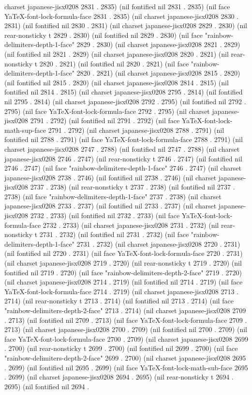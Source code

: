 charset japanese-jisx0208 2831 . 2835) (nil fontified nil 2831 . 2835) (nil face YaTeX-font-lock-formula-face 2831 . 2835) (nil charset japanese-jisx0208 2830 . 2831) (nil fontified nil 2830 . 2831) (nil charset japanese-jisx0208 2829 . 2830) (nil rear-nonsticky t 2829 . 2830) (nil fontified nil 2829 . 2830) (nil face "rainbow-delimiters-depth-1-face" 2829 . 2830) (nil charset japanese-jisx0208 2821 . 2829) (nil fontified nil 2821 . 2829) (nil charset japanese-jisx0208 2820 . 2821) (nil rear-nonsticky t 2820 . 2821) (nil fontified nil 2820 . 2821) (nil face "rainbow-delimiters-depth-1-face" 2820 . 2821) (nil charset japanese-jisx0208 2815 . 2820) (nil fontified nil 2815 . 2820) (nil charset japanese-jisx0208 2814 . 2815) (nil fontified nil 2814 . 2815) (nil charset japanese-jisx0208 2795 . 2814) (nil fontified nil 2795 . 2814) (nil charset japanese-jisx0208 2792 . 2795) (nil fontified nil 2792 . 2795) (nil face YaTeX-font-lock-formula-face 2792 . 2795) (nil charset japanese-jisx0208 2791 . 2792) (nil fontified nil 2791 . 2792) (nil face YaTeX-font-lock-math-sup-face 2791 . 2792) (nil charset japanese-jisx0208 2788 . 2791) (nil fontified nil 2788 . 2791) (nil face YaTeX-font-lock-formula-face 2788 . 2791) (nil charset japanese-jisx0208 2747 . 2788) (nil fontified nil 2747 . 2788) (nil charset japanese-jisx0208 2746 . 2747) (nil rear-nonsticky t 2746 . 2747) (nil fontified nil 2746 . 2747) (nil face "rainbow-delimiters-depth-1-face" 2746 . 2747) (nil charset japanese-jisx0208 2738 . 2746) (nil fontified nil 2738 . 2746) (nil charset japanese-jisx0208 2737 . 2738) (nil rear-nonsticky t 2737 . 2738) (nil fontified nil 2737 . 2738) (nil face "rainbow-delimiters-depth-1-face" 2737 . 2738) (nil charset japanese-jisx0208 2733 . 2737) (nil fontified nil 2733 . 2737) (nil charset japanese-jisx0208 2732 . 2733) (nil fontified nil 2732 . 2733) (nil face YaTeX-font-lock-formula-face 2732 . 2733) (nil charset japanese-jisx0208 2731 . 2732) (nil rear-nonsticky t 2731 . 2732) (nil fontified nil 2731 . 2732) (nil face "rainbow-delimiters-depth-1-face" 2731 . 2732) (nil charset japanese-jisx0208 2720 . 2731) (nil fontified nil 2720 . 2731) (nil face YaTeX-font-lock-formula-face 2720 . 2731) (nil charset japanese-jisx0208 2719 . 2720) (nil rear-nonsticky t 2719 . 2720) (nil fontified nil 2719 . 2720) (nil face "rainbow-delimiters-depth-2-face" 2719 . 2720) (nil charset japanese-jisx0208 2714 . 2719) (nil fontified nil 2714 . 2719) (nil face YaTeX-font-lock-formula-face 2714 . 2719) (nil charset japanese-jisx0208 2713 . 2714) (nil rear-nonsticky t 2713 . 2714) (nil fontified nil 2713 . 2714) (nil face "rainbow-delimiters-depth-2-face" 2713 . 2714) (nil charset japanese-jisx0208 2709 . 2713) (nil fontified nil 2709 . 2713) (nil face YaTeX-font-lock-formula-face 2709 . 2713) (nil charset japanese-jisx0208 2700 . 2709) (nil fontified nil 2700 . 2709) (nil face YaTeX-font-lock-formula-face 2700 . 2709) (nil charset japanese-jisx0208 2699 . 2700) (nil rear-nonsticky t 2699 . 2700) (nil fontified nil 2699 . 2700) (nil face "rainbow-delimiters-depth-2-face" 2699 . 2700) (nil charset japanese-jisx0208 2695 . 2699) (nil fontified nil 2695 . 2699) (nil face YaTeX-font-lock-math-sub-face 2695 . 2699) (nil charset japanese-jisx0208 2694 . 2695) (nil rear-nonsticky t 2694 . 2695) (nil fontified nil 2694 . 